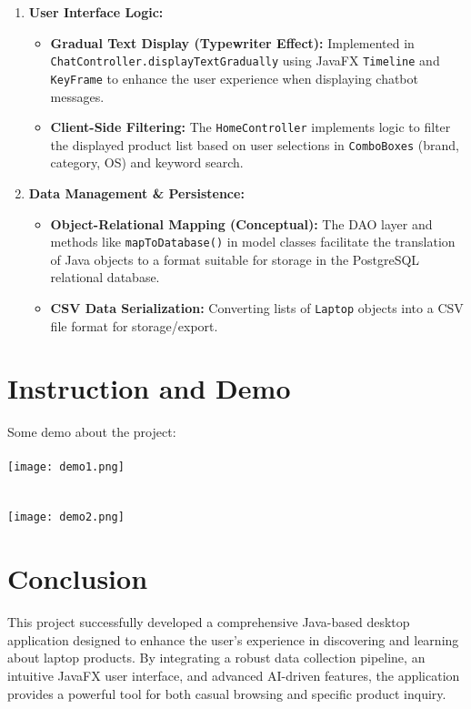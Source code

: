 \documentclass{article}
\begin{document}
\begin{enumerate}
\begin{itemize}
    \end{itemize}
    \item \textbf{User Interface Logic:}
    \begin{itemize}
        \item \textbf{Gradual Text Display (Typewriter Effect):} Implemented in \\\texttt{ChatController.displayTextGradually} using JavaFX \texttt{Timeline} and \texttt{KeyFrame} to enhance the user experience when displaying chatbot messages.
        \item \textbf{Client-Side Filtering:} The \texttt{HomeController} implements logic to filter the displayed product list based on user selections in \texttt{ComboBoxes} (brand, category, OS) and keyword search.
    \end{itemize}
    \item \textbf{Data Management \& Persistence:}
    \begin{itemize}
        \item \textbf{Object-Relational Mapping (Conceptual):} The DAO layer and methods like \texttt{mapToDatabase()} in model classes facilitate the translation of Java objects to a format suitable for storage in the PostgreSQL relational database.
        \item \textbf{CSV Data Serialization:} Converting lists of \texttt{Laptop} objects into a CSV file format for storage/export.
    \end{itemize}
\end{enumerate}

\newpage
\section{Instruction and Demo}
Some demo about the project:\\
\\
\texttt{[image: demo1.png]} %
\\
\\
\\
\texttt{[image: demo2.png]} %

\newpage
\section{Conclusion}
\hspace{0.5cm}This project successfully developed a comprehensive Java-based desktop application designed to enhance the user's experience in discovering and learning about laptop products. By integrating a robust data collection pipeline, an intuitive JavaFX user interface, and advanced AI-driven features, the application provides a powerful tool for both casual browsing and specific product inquiry.
\end{document}
